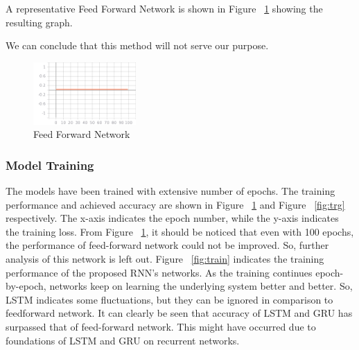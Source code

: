 A representative Feed Forward Network is shown in Figure ~\ref{fig:feedforward} showing the resulting graph.

We can conclude that this method will not serve our purpose. 


\begin{figure}[h!]
	\centering
	\includegraphics[width=0.35\textwidth]{fig/epoch_accuracy.png}
	\caption{Feed Forward Network}
	\label{fig:feedforward}
\end{figure}



\subsubsection{Model Training}

The models have been trained with extensive number of epochs. The training performance and achieved accuracy are shown in Figure ~\ref{fig:feedforward} and Figure ~\ref{fig:trg} respectively. The x-axis indicates the epoch number, while the y-axis indicates the training loss. From Figure ~\ref{fig:feedforward}, it should be noticed that even with 100 epochs, the performance of feed-forward network could not be improved. So, further analysis of this network is left out. Figure ~\ref{fig:train} indicates the training performance of the proposed RNN’s networks. As the training continues epoch-by-epoch, networks keep on learning the underlying system better and better. So, LSTM indicates some fluctuations, but they can be ignored in comparison to feedforward network. It can clearly be seen that accuracy of LSTM and GRU has surpassed that of feed-forward network. This might have occurred due to foundations of LSTM and GRU on recurrent networks. 

